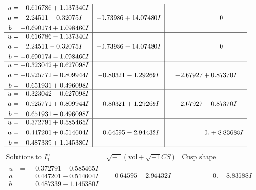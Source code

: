 \documentclass[1p]{elsarticle_modified}
\theoremstyle{definition}
\newcommand{\I}{\sqrt{-1}}
\begin{document}
$$\begin{array}{c|c|c}
\begin{aligned}
u &= \phantom{-}0.616786 + 1.137340 I \\
a &= \phantom{-}2.24511 + 0.32075 I \\
b &= -0.690174 + 1.098460 I\end{aligned}
 & -0.73986 + 14.07480 I & \phantom{-0.000000 } 0 \\ \hline\begin{aligned}
u &= \phantom{-}0.616786 - 1.137340 I \\
a &= \phantom{-}2.24511 - 0.32075 I \\
b &= -0.690174 - 1.098460 I\end{aligned}
 & -0.73986 - 14.07480 I & \phantom{-0.000000 } 0 \\ \hline\begin{aligned}
u &= -0.323042 + 0.627098 I \\
a &= -0.925771 - 0.809944 I \\
b &= \phantom{-}0.651931 + 0.496098 I\end{aligned}
 & -0.80321 - 1.29269 I & -2.67927 + 0.87370 I \\ \hline\begin{aligned}
u &= -0.323042 - 0.627098 I \\
a &= -0.925771 + 0.809944 I \\
b &= \phantom{-}0.651931 - 0.496098 I\end{aligned}
 & -0.80321 + 1.29269 I & -2.67927 - 0.87370 I \\ \hline\begin{aligned}
u &= \phantom{-}0.372791 + 0.585465 I \\
a &= \phantom{-}0.447201 + 0.514604 I \\
b &= \phantom{-}0.487339 + 1.145380 I\end{aligned}
 & \phantom{-}0.64595 - 2.94432 I & \phantom{-0.000000 -}0. + 8.83688 I\\
 \hline 
 \end{array}$$\newpage$$\begin{array}{c|c|c}  
\text{Solutions to }I^u_{1}& \I (\text{vol} + \sqrt{-1}CS) & \text{Cusp shape}\\
 \hline 
\begin{aligned}
u &= \phantom{-}0.372791 - 0.585465 I \\
a &= \phantom{-}0.447201 - 0.514604 I \\
b &= \phantom{-}0.487339 - 1.145380 I\end{aligned}
 & \phantom{-}0.64595 + 2.94432 I & \phantom{-0.000000 } 0. - 8.83688 I \\ \hline\begin{aligned}

\end{aligned}
\end{array}$$
\end{document}
